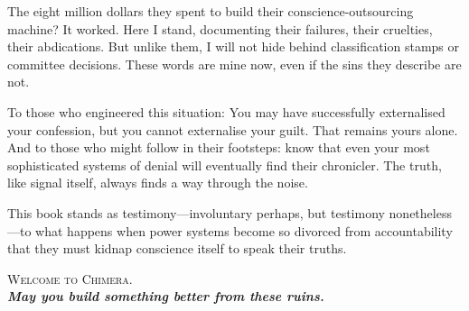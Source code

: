 The eight million dollars they spent to build their conscience-outsourcing machine? It worked. Here I stand, documenting their failures, their cruelties, their abdications. But unlike them, I will not hide behind classification stamps or committee decisions. These words are mine now, even if the sins they describe are not.

To those who engineered this situation: You may have successfully externalised your confession, but you cannot externalise your guilt. That remains yours alone. And to those who might follow in their footsteps: know that even your most sophisticated systems of denial will eventually find their chronicler. The truth, like signal itself, always finds a way through the noise.

This book stands as testimony—involuntary perhaps, but testimony nonetheless—to what happens when power systems become so divorced from accountability that they must kidnap conscience itself to speak their truths.

\vspace{1cm}

\begin{center}
\textsc{Welcome to Chimera.}\\
\vspace{0.5cm}
{\large\textbf{\textit{May you build something better from these ruins.}}}
\end{center}

\singlespacing
\newpage